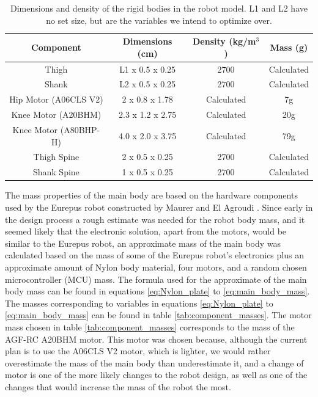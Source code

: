 \begin{table}
\centering
\begin{tabular}{|c|c|c|c|}
\hline
\textbf{Component} & \textbf{Dimensions (cm)} & \textbf{Density (kg/m$^3$)} & \textbf{Mass (g)}\\
\hline
Thigh & L1 x 0.5 x 0.25 & 2700 & Calculated \\
Shank & L2 x 0.5 x 0.25 & 2700 & Calculated \\
Hip Motor (A06CLS V2) & 2 x 0.8 x 1.78 & Calculated &  7g \\
Knee Motor (A20BHM) & 2.3 x 1.2 x 2.75 & Calculated & 20g \\
Knee Motor (A80BHP-H) & 4.0 x 2.0 x 3.75 & Calculated & 79g \\
Thigh Spine & 2 x 0.5 x 0.25 & 2700 & Calculated \\
Shank Spine & 1 x 0.5 x 0.25 & 2700 & Calculated \\
\hline
\end{tabular}
\caption{Dimensions and density of the rigid bodies in the robot model. L1 and L2 have no set size, but are the variables we intend to optimize over. }
\label{tab:mass_geometry_properties}
\end{table}

The mass properties of the main body are based on the hardware components used by the Eurepus robot constructed by Maurer and El Agroudi \cite{finn_tarek_master}. Since early in the design process a rough estimate was needed for the robot body mass, and it seemed likely that the electronic solution, apart from the motors, would be similar to the Eurepus robot, an approximate mass of the main body was calculated based on the mass of some of the Eurepus robot's electronics plus an approximate amount of Nylon body material, four motors, and a random chosen microcontroller (MCU) mass. The formula used for the approximate of the main body mass can be found in equations \ref{eq:Nylon_plate} to \ref{eq:main_body_mass}. The masses corresponding to variables in equations \ref{eq:Nylon_plate} to \ref{eq:main_body_mass} can be found in table \ref{tab:component_masses}. The motor mass chosen in table \ref{tab:component_masses} corresponds to the mass of the AGF-RC A20BHM motor. This motor was chosen because, although the current plan is to use the A06CLS V2 motor, which is lighter, we would rather overestimate the mass of the main body than underestimate it, and a change of motor is one of the more likely changes to the robot design, as well as one of the changes that would increase the mass of the robot the most. 


